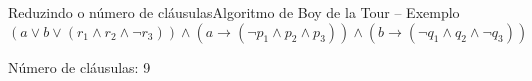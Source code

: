 \begin{frame}{Reduzindo o número de cláusulas}{Algoritmo de Boy de la Tour -- Exemplo}
	$$(a \vee b \vee (r_1 \wedge r_2 \wedge \neg r_3)) \wedge (a \rightarrow (\neg p_1 \wedge p_2 \wedge p_3)) \wedge (b \rightarrow (\neg q_1 \wedge q_2 \wedge \neg q_3))$$
	
	\pause Número de cláusulas: 9
\end{frame}
